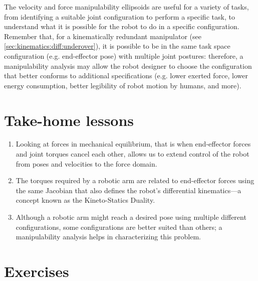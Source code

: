 The velocity and force manipulability ellipsoids are useful for a variety of tasks, from identifying a suitable joint configuration to perform a specific task, to understand what it is possible for the robot to do in a specific configuration. Remember that, for a kinematically redundant manipulator (see \cref{sec:kinematics:diff:underover}), it is possible to be in the same task space configuration (e.g. end-effector pose) with multiple joint postures: therefore, a manipulability analysis may allow the robot designer to choose the configuration that better conforms to additional specifications (e.g. lower exerted force, lower energy consumption, better legibility of robot motion by humans, and more).




\section*{Take-home lessons}
\begin{enumerate}
\item Looking at forces in mechanical equilibrium, that is when end-effector forces and joint torques cancel each other, allows us to extend control of the robot from poses and velocities to the force domain.
\item The torques required by a robotic arm are related to end-effector forces using the same Jacobian that also defines the robot’s differential kinematics---a concept known as the Kineto-Statics Duality.
\item Although a robotic arm might reach a desired pose using multiple different configurations, some configurations are better suited than others; a manipulability analysis helps in characterizing this problem.
\end{enumerate}

\section*{Exercises}\small

